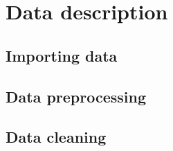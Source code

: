 %
%   
\clearpage
\section{Data description}
\subsection{Importing data}
\subsection{Data preprocessing}
\subsection{Data cleaning}